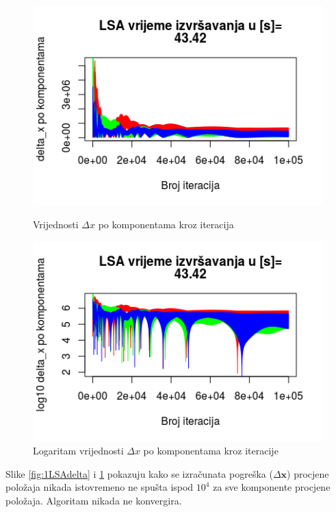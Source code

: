 \documentclass[a4paper,twoside,12pt]{memoir} %
\begin{document}
\begin{figure}[H]
	\begin{minipage}{0.48\textwidth}
		\centering
			\includegraphics[width=1\textwidth]{1LSAdelta}
		\caption{Vrijednosti $\Delta x$ po komponentama kroz iteracija}
		\label{fig:1LSAdelta}
	\end{minipage}%
	\hspace{1cm}
	\begin{minipage}{0.48\textwidth}
		
		\includegraphics[width=1\textwidth]{1LSAdeltal10}
		\caption{Logaritam vrijednosti $\Delta x$ po komponentama kroz iteracije}
		\label{fig:1LSAdeltal10}
	\end{minipage}%
\end{figure}
Slike \ref{fig:1LSAdelta} i \ref{fig:1LSAdeltal10} pokazuju kako se izračunata pogreška ($\Delta \mathbf{x}$) procjene položaja nikada istovremeno ne spušta ispod $10^4$ za sve komponente procjene položaja. Algoritam nikada ne konvergira.
\end{document}
